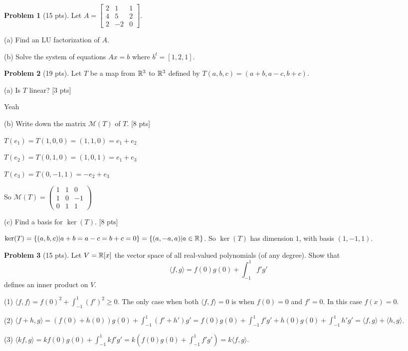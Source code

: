 \documentclass[12pt]{amsart}
\theoremstyle{definition}
\newtheorem{prob}{Problem}
\newcommand{\blu}[1]{{\color{blue}#1}}
\begin{document}
\begin{prob}[15 pts]
	Let $A=\left[ \begin{array}{cccc} 2 & 1 & 1  \\ 4 & 5 & 2  \\ 2 & -2  & 0 \end{array} \right] .$
	
	
	
	(a) Find an LU factorization of $A$. 	
		
	(b) Solve the system of equations $Ax=b$ where $b^t=[1,2,1]$. 
	
	
\end{prob}



\begin{prob}[19 pts]
Let $T$ be a map from $\mathbb{R}^3$ to $\mathbb{R}^3$ defined by $T(a,b,c)=(a+b,a-c,b+c)$.

(a) Is $T$ linear? [3 pts]

\blu{Yeah}

(b) Write down the matrix $\mathcal{M}(T)$ of $T$. [8 pts]

\blu{$T(e_1)=T(1,0,0)=(1,1,0)=e_1+e_2$

$T(e_2)=T(0,1,0)=(1,0,1)=e_1+e_3$

$T(e_3)=T(0,-1,1)=-e_2+e_3$

So $\mathcal{M}(T)=\begin{pmatrix}
	1&1&0\\1&0&-1\\0&1&1
\end{pmatrix}$
}

(c) Find a basis for $\ker(T)$. [8 pts]

\blu{
$\ker(T)=\{(a,b,c)|a+b=a-c=b+c=0\}=\{(a,-a,a)|a\in \mathbb{R}\}$. So $\ker(T)$ has dimension $1$, with basis $(1,-1,1)$.
}
\end{prob}


\begin{prob}[15 pts]
	Let $V=\mathbb{R}[x]$ the vector space of all real-valued polynomials (of any degree). Show that $$\langle f,g\rangle =f(0)g(0) +\int_{-1}^{1}f'g'$$ 
	defines an inner product on $V$.
\end{prob}
\blu{
(1) $\langle f,f\rangle =f(0)^2 +\int_{-1}^1 (f')^2\geq 0$. The only case when both $\langle f,f\rangle=0$ is when $f(0)=0$ and $f'=0$. In this case $f(x)=0$.

(2) $\langle f+h,g\rangle =(f(0)+h(0))g(0)+\int_{-1}^1(f'+h')g'=f(0)g(0)+\int_{-1}^1f'g'+h(0)g(0)+\int_{-1}^1 h'g'=\langle f,g\rangle +\langle h,g\rangle$.

(3) $\langle kf,g\rangle =kf(0)g(0)+\int_{-1}^{1}kf'g'=k(f(0)g(0)+\int_{-1}^1f'g')=k\langle f,g\rangle$.
}
\end{document}
